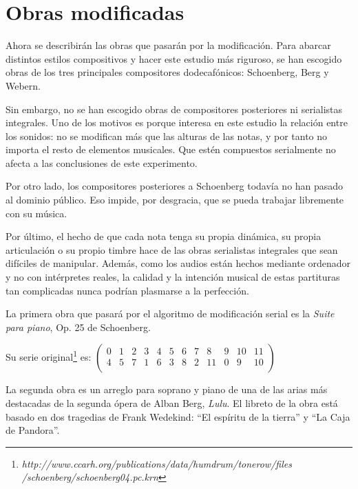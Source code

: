 	\section{Obras modificadas}
                
        Ahora se describirán las obras que pasarán por la modificación. Para abarcar distintos estilos compositivos y hacer este estudio más riguroso, se han escogido obras de los tres principales compositores dodecafónicos: Schoenberg, Berg y Webern.
        
        Sin embargo, no se han escogido obras de compositores posteriores ni serialistas integrales. Uno de los motivos es porque interesa en este estudio la relación entre los sonidos: no se modifican más que las alturas de las notas, y por tanto no importa el resto de elementos musicales. Que estén compuestos serialmente no afecta a las conclusiones de este experimento.
        
        Por otro lado, los compositores posteriores a Schoenberg todavía no han pasado al dominio público. Eso impide, por desgracia, que se pueda trabajar libremente con su música.
        
        Por último, el hecho de que cada nota tenga su propia dinámica, su propia articulación o su propio timbre hace de las obras serialistas integrales que sean difíciles de manipular. Además, como los audios están hechos mediante ordenador y no con intérpretes reales, la calidad y la intención musical de estas partituras tan complicadas nunca podrían plasmarse a la perfección.
        
        La primera obra que pasará por el algoritmo de modificación serial es la \textit{Suite para piano}, Op. 25 de Schoenberg.
        
        {Su serie original\footnote{\textit{http://www.ccarh.org/publications/data/humdrum/tonerow/files\\/schoenberg/schoenberg04.pc.krn}} es: $\left(\begin{matrix}0&1&2&3&4&5&6&7&8&9&10&11\\4&5&7&1&6&3&8&2&11&0&9&10\\\end{matrix}\right)$}
        
        La segunda obra es un arreglo para soprano y piano de una de las arias más destacadas de la segunda ópera de Alban Berg, \textit{Lulu}. El libreto de la obra está basado en dos tragedias de Frank Wedekind: ``El espíritu de la tierra'' y ``La Caja de Pandora''.
        
